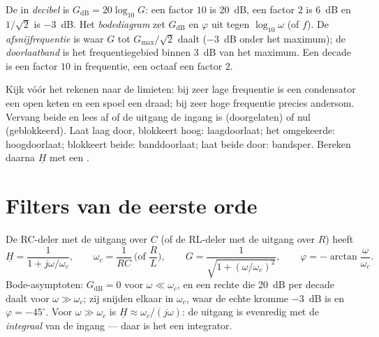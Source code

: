 \begin{definition}\label{def:b1:filters-transfer-functions:bode}
De  in \emph{decibel} is $G_{\mathrm{dB}} = 20\log_{10}G$: een factor
$10$ is \qty{20}{dB}, een factor $2$ is \qty{6}{dB} en $1/\sqrt2$ is
\qty{-3}{dB}. Het \emph{bodediagram} zet $G_{\mathrm{dB}}$ en
$\varphi$ uit tegen $\log_{10}\omega$ (of $f$). De \emph{afsnijfrequentie}
is waar $G$ tot $G_{\max}/\sqrt2$ daalt (\qty{-3}{dB} onder
het maximum); de \emph{doorlaatband} is het frequentiegebied binnen
\qty{3}{dB} van het maximum. Een decade is een factor $10$ in frequentie, een
octaaf een factor $2$.
\end{definition}

\begin{method}\label{met:b1:filters-transfer-functions:nature}
Kijk vóór het rekenen naar de limieten: bij zeer lage frequentie is een condensator
een open keten en een spoel een draad; bij zeer hoge frequentie precies
andersom. Vervang beide en lees af of de uitgang de ingang is
(doorgelaten) of nul (geblokkeerd). Laat laag door, blokkeert hoog: laagdoorlaat; het
omgekeerde: hoogdoorlaat; blokkeert beide: banddoorlaat; laat beide door: bandsper.
Bereken daarna $\underline H$ met een .
\end{method}

\section{Filters van de eerste orde}

\begin{proposition}\label{prop:b1:filters-transfer-functions:lowpass1}
De RC-deler met de uitgang over $C$ (of de RL-deler met de uitgang
over $R$) heeft
\[
\underline H = \frac{1}{1 + j\omega/\omega_c}, \qquad
\omega_c = \frac{1}{RC} \ \Big(\text{of } \frac{R}{L}\Big),
\qquad G = \frac{1}{\sqrt{1 + (\omega/\omega_c)^2}}, \qquad
\varphi = -\arctan\frac{\omega}{\omega_c} .
\]
Bode-asymptoten: $G_{\mathrm{dB}} = 0$ voor $\omega \ll \omega_c$, en een
rechte die \qty{20}{dB} per decade daalt voor $\omega \gg \omega_c$;
zij snijden elkaar in $\omega_c$, waar de echte kromme \qty{-3}{dB} is en
$\varphi = -45^\circ$. Voor $\omega \gg \omega_c$ is $\underline H \approx
\omega_c/(j\omega)$: de uitgang is evenredig met de \emph{integraal}
van de ingang --- daar is het  een integrator.
\end{proposition}

